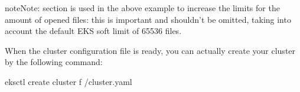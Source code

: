 \documentclass[letterpaper,10pt,english]{sphinxmanual}
\begin{document}
\begin{sphinxadmonition}{note}{Note:}
 section is used in the
above example to increase the limits for the amount of opened files:
this is important and shouldn’t be omitted, taking into account the
default EKS soft limit of 65536 files.
\end{sphinxadmonition}

When the cluster configuration file is ready, you can actually create your cluster
by the following command:

\begin{sphinxVerbatim}[commandchars=\\\{\}]
\PYGZdl{} eksctl create cluster \PYGZhy{}f \PYGZti{}/cluster.yaml
\end{sphinxVerbatim}
\end{document}
